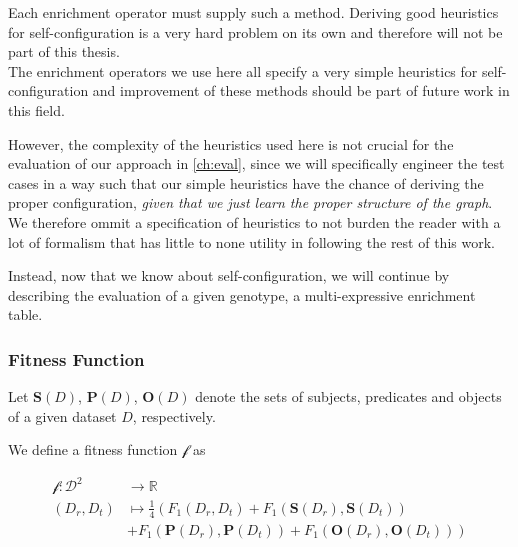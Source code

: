 Each enrichment operator must supply such a method.
Deriving good heuristics for self-configuration is a very hard problem on its own and therefore will not be part of this thesis.\\

The enrichment operators we use here all specify a very simple heuristics for self-configuration and improvement of these methods should be part of future work in this field.

However, the complexity of the heuristics used here is not crucial for the evaluation of our approach in \autoref{ch:eval}, since we will specifically engineer the test cases in a way such that our simple heuristics have the chance of deriving the proper configuration, \emph{given that we just learn the proper structure of the graph}.\\

We therefore ommit a specification of heuristics to not burden the reader with a lot of formalism that has little to none utility in following the rest of this work.

Instead, now that we know about self-configuration, we will continue by describing the evaluation of a given genotype, \ie a multi-expressive enrichment table.

\subsubsection{Fitness Function}
\label{sssec:fitness}
Let $\mathbf{S}(D)$, $\mathbf{P}(D)$, $\mathbf{O}(D)$ denote the sets of subjects, predicates and objects of a given dataset $D$, respectively.

We define a fitness function $\mathcal{f}$ as

\begin{equation}
  \begin{aligned}
    \mathcal{f} \colon \mathcal{D}^2 & \to \mathbb{R} \\
    (D_r, D_t) & \mapsto \frac{1}{4} \left( F_1\left( D_r, D_t \right) + F_1\left( \mathbf{S}(D_r), \mathbf{S}(D_t) \right) \right. \\
    & \left. + F_1\left( \mathbf{P}(D_r), \mathbf{P}(D_t) \right) + F_1\left( \mathbf{O}(D_r), \mathbf{O}(D_t) \right)\right)
  \end{aligned}
  \label{eq:fitness}
\end{equation}

